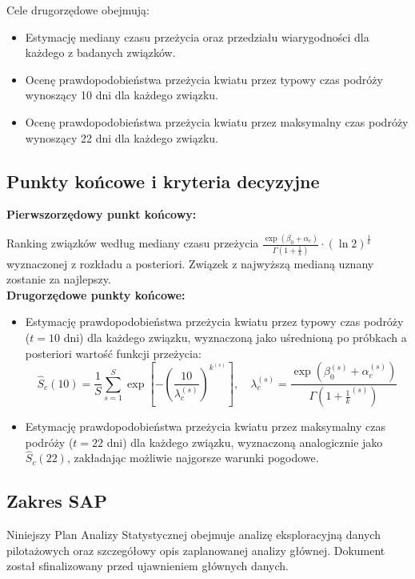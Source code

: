 \documentclass[12pt, a4paper]{article}
\begin{document}
Cele drugorzędowe obejmują:
\begin{itemize}[noitemsep]
    \item Estymację mediany czasu przeżycia oraz przedziału wiarygodności dla każdego z badanych związków.
    \item Ocenę prawdopodobieństwa przeżycia kwiatu przez typowy czas podróży wynoszący 10 dni dla każdego związku.
    \item Ocenę prawdopodobieństwa przeżycia kwiatu przez maksymalny czas podróży wynoszący 22 dni dla każdego związku.
\end{itemize}

\subsection{Punkty końcowe i kryteria decyzyjne}\label{subsec:endpoints}

\textbf{Pierwszorzędowy punkt końcowy:}
\par Ranking związków według mediany czasu przeżycia $\frac{\exp(\beta_0 + \alpha_c)}{\Gamma(1+\frac{1}{k})} \cdot (\ln 2)^{\frac{1}{k}}$ wyznaczonej z rozkładu a posteriori. Związek z najwyższą medianą uznany zostanie za najlepszy.\\
\textbf{Drugorzędowe punkty końcowe:}
\begin{itemize}[noitemsep]
    \item Estymację prawdopodobieństwa przeżycia kwiatu przez typowy czas podróży ($t = 10$ dni) dla każdego związku, wyznaczoną jako uśrednioną po próbkach a posteriori wartość funkcji przeżycia:
    \[
        \hat{S}_c(10) = \frac{1}{S}\sum_{s=1}^{S} \exp\!\left[-\!\left(\frac{10}{\lambda_c^{(s)}}\right)^{\!k^{(s)}}\right], \quad \lambda_c^{(s)} = \frac{\exp\!\left(\beta_0^{(s)} + \alpha_c^{(s)}\right)}{\Gamma\!\left(1+\frac{1}{k}^{(s)}\right)}
    \]
    \item Estymację prawdopodobieństwa przeżycia kwiatu przez maksymalny czas podróży ($t = 22$ dni) dla każdego związku, wyznaczoną analogicznie jako $\hat{S}_c(22)$, zakładając możliwie najgorsze warunki pogodowe.
\end{itemize}

\subsection{Zakres SAP}
Niniejszy Plan Analizy Statystycznej obejmuje analizę eksploracyjną danych pilotażowych oraz szczegółowy opis zaplanowanej analizy głównej. Dokument został sfinalizowany przed ujawnieniem głównych danych.
\end{document}
